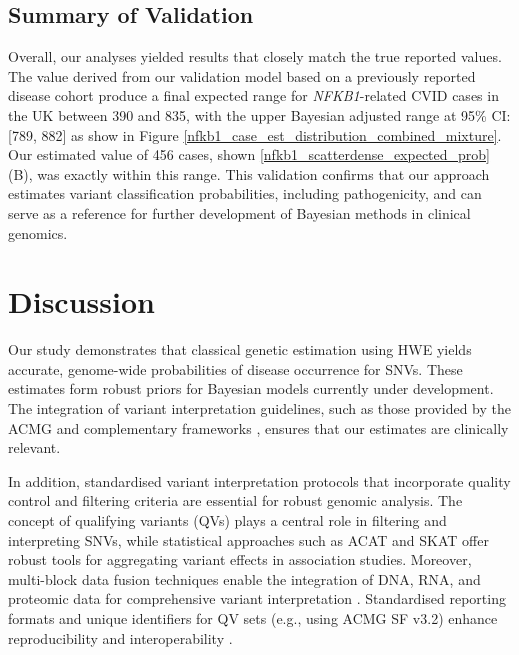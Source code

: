 \documentclass[a4paper,12pt]{article}
\begin{document}
\subsection{Summary of Validation}
Overall, our analyses yielded results that closely match the true reported values. The value derived from our validation model based on a previously reported disease cohort \cite{tuijnenburgNFKB12018} 
produce a final expected range for \textit{NFKB1}-related CVID cases in the UK between 390 and 835, with the upper Bayesian adjusted range at 95\% CI: [789, 882] as show in Figure
\ref{nfkb1_case_est_distribution_combined_mixture}. 
Our estimated value of 456 cases, shown 
\ref{nfkb1_scatterdense_expected_prob} (B), was exactly within this range.
This validation confirms that our approach estimates variant classification probabilities, including pathogenicity, and can serve as a reference for further development of Bayesian methods in clinical genomics.


\section{Discussion}
Our study demonstrates that classical genetic estimation using HWE yields accurate, genome-wide probabilities of disease occurrence for SNVs. These estimates form robust priors for Bayesian models currently under development. The integration of variant interpretation guidelines, such as those provided by the ACMG \citep{richards2015standards} and complementary frameworks \citep{tavtigian2020fitting,li2017intervar}, ensures that our estimates are clinically relevant.

In addition, standardised variant interpretation protocols that incorporate quality control and filtering criteria \citep{pedersen2021effective,anderson2010data} are essential for robust genomic analysis. The concept of qualifying variants (QVs) \citep{cirulli2015exome,tavtigian2020fitting} plays a central role in filtering and interpreting SNVs, while statistical approaches such as ACAT and SKAT \citep{liu2019acat,li2020dynamic,wu2011rare,lee2012optimal} offer robust tools for aggregating variant effects in association studies. Moreover, multi-block data fusion techniques enable the integration of DNA, RNA, and proteomic data for comprehensive variant interpretation \citep{kong2018nature,howe2021within}. Standardised reporting formats and unique identifiers for QV sets (e.g., using ACMG SF v3.2) enhance reproducibility and interoperability \citep{miller2023acmg}.
\end{document}
